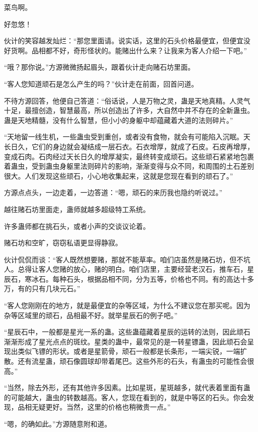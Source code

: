 \begin{this_body}
菜鸟啊。

好忽悠！

伙计的笑容越发灿烂：“那您里面请。说实话，这里的石头价格最便宜，但便宜没好货啊。品相都不好，奇形怪状的。能赌出什么来？让我来为客人介绍一下吧。”

“哦？那你说。”方源微微扬起眉头，跟着伙计走向赌石坊里面。

“客人您知道顽石是怎么产生的吗？”伙计走在前面，回首问道。

不待方源回答，他便自己答道：“俗话说，人是万物之灵，蛊是天地真精。人灵气十足，最擅创造，智慧最高，所以创造出了许多，大自然中并不存在的全新蛊虫。蛊是天地精髓，没有什么智慧，但小小的身躯中却蕴藏着大道的法则碎片。”

“天地留一线生机，一些蛊虫受到重创，或者没有食物，就会有可能陷入沉眠。天长日久，它们的身边就会凝结成一层石衣。石衣增厚，就成了石皮。石皮再增厚，变成石肉。石肉经过天长日久的增厚凝实，最终转变成顽石。这些顽石紧紧地包裹着蛊虫，受到蛊虫身躯里法则碎片的影响，渐渐变得与众不同，和周围的土石差别很大。人们发现这些顽石，小心地收集起来，这就是您现在看到的顽石了。”

方源点点头，一边走着，一边答道：“嗯，顽石的来历我也隐约听说过。”

越往赌石坊里面走，蛊师就越多超级特工系统。

许多蛊师都在挑石头，或者小声的交谈议论着。

赌石坊和空旷，窃窃私语更显得静寂。

伙计侃侃而谈：“客人既然想要赌，那就不能草率。咱们店虽然是赌石坊，但不坑人。总得让客人您赌的放心，赌的明白。咱们店里，主要经营老汉石，推车石，星辰石，寒冰石。每种石头，根据品相不同，分为五等，价格也不同。有的高达十多万，有的只有几块元石。”

“客人您刚刚在的地方，就是最便宜的杂等区域，为什么不建议您在那买呢。因为杂等区域里的顽石，品相最不好。就举星辰石的例子吧。”

“星辰石中，一般都是星光一系的蛊。这些蛊蕴藏着星辰的运转的法则，因此顽石渐渐形成了星光点点的斑纹。星类的蛊中，最常见的是一转星镖蛊，因此顽石会呈现出类似飞镖的形状。或者是星箭骨，顽石一般都是长条形，一端尖锐，一端扩散。还有流星蛊，顽石像圆球却带着尾巴。这些外形的石头，有蛊虫的可能性会很高。”

“当然，除去外形，还有其他许多因素。比如星斑，星斑越多，就代表着里面有蛊的可能越大，蛊虫的转数越高。客人，您现在看到的，就是中等区的石头。你会发现，品相无疑更好。当然，这里的价格也稍微贵一点。”

“嗯，的确如此。”方源随意附和道。


\end{this_body}
